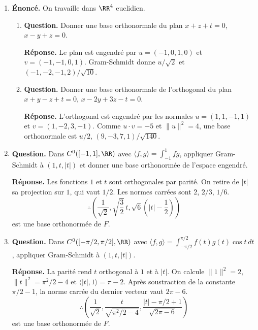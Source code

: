 \documentclass[12pt, a4paper]{article}
\begin{document}
\begin{enumerate}[label=8.\arabic*., start=70]
  \item \begin{minipage}[t]{\linewidth}\raggedright
\textbf{Énoncé.} On travaille dans $\RR^4$ euclidien.

\begin{enumerate}[\arabic*.]
        \item \textbf{Question.} Donner une base orthonormale du plan $x+z+t=0$, $x-y+z=0$.
\par\smallskip
\textbf{Réponse.} Le plan est engendré par $u=(-1,0,1,0)$ et $v=(-1,-1,0,1)$.
        Gram-Schmidt donne $u/\sqrt2$ et $(-1,-2,-1,2)/\sqrt{10}$.

  \item \textbf{Question.} Donner une base orthonormale de l’orthogonal du plan $x+y-z+t=0$, $x-2y+3z-t=0$.
\par\smallskip
\textbf{Réponse.} L'orthogonal est engendré par les normales $u=(1,1,-1,1)$ et $v=(1,-2,3,-1)$.
        Comme $u\cdot v=-5$ et $\|u\|^2=4$, une base orthonormale est
        $u/2$, $(9,-3,7,1)/\sqrt{140}$.

\end{enumerate}
\end{minipage}

  \item \begin{minipage}[t]{\linewidth}\raggedright
\textbf{Question.} Dans $C^0([-1,1],\RR)$ avec $\langle f,g\rangle=\int_{-1}^1fg$, appliquer Gram-Schmidt à $(1,t,|t|)$ et donner une base orthonormée de l’espace engendré.
\par\smallskip
\textbf{Réponse.} Les fonctions $1$ et $t$ sont orthogonales par parité.
    On retire de $|t|$ sa projection sur $1$, qui vaut $1/2$.
    Les normes carrées sont $2$, $2/3$, $1/6$.
    \[
      \therefore\left(\frac1{\sqrt2},\sqrt{\frac32}\,t,\sqrt6\left(|t|-\frac12\right)\right)
    \]
    est une base orthonormée de $F$.
\end{minipage}

  \item \begin{minipage}[t]{\linewidth}\raggedright
\textbf{Question.} Dans $C^0([-\pi/2,\pi/2],\RR)$ avec $\langle f,g\rangle=\int_{-\pi/2}^{\pi/2}f(t)g(t)\cos t\,dt$, appliquer Gram-Schmidt à $(1,t,|t|)$.
\par\smallskip
\textbf{Réponse.} La parité rend $t$ orthogonal à $1$ et à $|t|$.
    On calcule $\|1\|^2=2$, $\|t\|^2=\pi^2/2-4$ et $\langle|t|,1\rangle=\pi-2$.
    Après soustraction de la constante $\pi/2-1$, la norme carrée du dernier vecteur vaut $2\pi-6$.
    \[
      \therefore\left(\frac1{\sqrt2},\frac{t}{\sqrt{\pi^2/2-4}},
        \frac{|t|-\pi/2+1}{\sqrt{2\pi-6}}\right)
    \]
    est une base orthonormée de $F$.
\end{minipage}


\end{enumerate}
\end{document}
